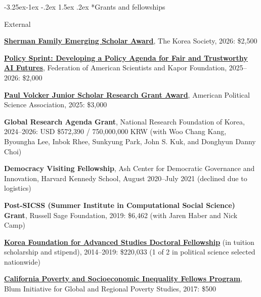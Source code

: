 \documentclass[10pt, letterpaper]{article}
\makeatletter
\renewcommand\subsection{\@startsection{subsection}{2}{\z@}%
  {-3.25ex\@plus -1ex \@minus -.2ex}%
  {1.5ex \@plus .2ex}%
  {\normalfont\large\bfseries\color{cvnavy}}}
\renewenvironment{itemize}{
\begin{list}{}{
        \setlength{\leftmargin}{1.5em}
        \setlength{\itemsep}{0.10em}
        \setlength{\parskip}{0pt}
        \setlength{\parsep}{0.10em}
    }
}{
\end{list}
}
\makeatother
\begin{document}
\subsection*{Grants and fellowships} 
\begin{itemize}
    \item External 
\begin{etaremune}

\item \textbf{\href{https://www.koreasociety.org/}{Sherman Family Emerging Scholar Award}}, The Korea Society, 2026: \$2,500

\item \textbf{\href{https://fas.org/accelerator/source-code/}{Policy Sprint: Developing a Policy Agenda for Fair and Trustworthy AI Futures}}, Federation of American Scientists and Kapor Foundation, 2025--2026: \$2,000

\item \textbf{\href{https://apsanet.org/membership/organized-sections/organized-section-6-volcker-junior-scholar-research-grant/}{Paul Volcker Junior Scholar Research Grant Award}}, American Political Science Association, 2025: \$3,000
\item \textbf{Global Research Agenda Grant}, National Research Foundation of Korea, 2024--2026: USD \$572,390 / 750,000,000 KRW (with Woo Chang Kang, Byoungha Lee, Inbok Rhee, Sunkyung Park, John S. Kuk, and Donghyun Danny Choi) 
\item \textbf{Democracy Visiting Fellowship}, Ash Center for Democratic Governance and Innovation, Harvard Kennedy School, August 2020--July 2021 (declined due to logistics)
\item \textbf{Post-SICSS (Summer Institute in Computational Social Science) Grant}, Russell Sage Foundation, 2019: \$6,462 (with Jaren Haber and Nick Camp)
\item \textbf{\href{http://www.kfas.or.kr/ScholarShip/ScholarShip0201.aspx?pCulture=en}{Korea Foundation for Advanced Studies Doctoral Fellowship}} (in tuition scholarship and stipend), 2014--2019: \$220,033 (1 of 2 in political science selected nationwide)
\item \textbf{\href{https://blum.ucr.edu/research/fellows}{California Poverty and Socioeconomic Inequality Fellows Program}}, Blum Initiative for Global and Regional Poverty Studies, 2017: \$500

\end{etaremune}


\end{itemize}
\end{document}
